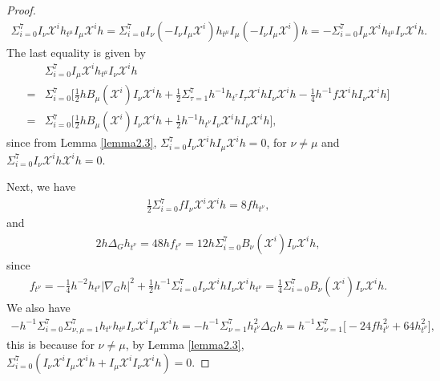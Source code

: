 \documentclass[10pt,a4paper]{amsart}
\numberwithin{equation}{section}
\begin{document}
\begin{proof}
\begin{align*}
\Sigma_{i=0}^7I_\nu\mathscr{X}^i h_{t^\mu}I_\mu\mathscr{X}^i h=\Sigma_{i=0}^7 I_\nu(-I_\nu I_\mu\mathscr{X}^i) h_{t^\mu}I_\mu(-I_\nu I_\mu\mathscr{X}^i) h=-\Sigma_{i=0}^7I_\mu \mathscr{X}^i h_{t^\mu}I_\nu \mathscr{X}^i h.
\end{align*}
The last equality is given by
\begin{align*}
    &\Sigma_{i=0}^7I_\mu\mathscr{X}^i h_{t^\mu}I_\nu\mathscr{X}^ih\\=&\Sigma_{i=0}^7\bigg[\frac{1}{2}hB_\mu(\mathscr{X}^i)I_\nu\mathscr{X}^i h+\frac{1}{2}\Sigma_{\tau=1}^7h^{-1}h_{t^\tau}I_\tau \mathscr{X}^i hI_\nu\mathscr{X}^i h-\frac{1}{4}h^{-1}f\mathscr{X}^i h I_\nu\mathscr{X}^i h\bigg]\\=&\Sigma_{i=0}^7\bigg[\frac{1}{2}hB_\mu(\mathscr{X}^i)I_\nu\mathscr{X}^i h+\frac{1}{2}h^{-1}h_{t^\nu}I_\nu \mathscr{X}^i hI_\nu\mathscr{X}^i h\bigg],\end{align*}
since from Lemma \ref{lemma2.3}, $\Sigma_{i=0}^7I_\nu \mathscr{X}^i h I_\mu \mathscr{X}^i h=0$, for $\nu\neq \mu$ and $\Sigma_{i=0}^7I_\nu\mathscr{X}^i h\mathscr{X}^i h=0.$


Next, we have
\begin{align*}
    \frac{1}{2}\Sigma_{i=0}^7fI_\nu\mathscr{X}^i\mathscr{X}^i h=8fh_{t^\nu},
\end{align*}
and
\begin{align*}
    2h\Delta_G h_{t^\nu}=48 h f_{t^\nu}=12h\Sigma_{i=0}^7B_\nu(\mathscr{X}^i)I_\nu\mathscr{X}^i h,\end{align*}
    since
\begin{align}\label{ft}
    f_{t^\nu}=-\frac{1}{4}h^{-2}h_{t^\nu}|\nabla_G h|^2+\frac{1}{2}h^{-1}\Sigma_{i=0}^7  I_\nu\mathscr{X}^i h I_\nu\mathscr{X}^i h_{t^\nu}=\frac{1}{4}\Sigma_{i=0}^7B_\nu(\mathscr{X}^i)I_\nu\mathscr{X}^i h.
    \end{align}
We also have
\begin{align*}
    -h^{-1}\Sigma_{i=0}^7\Sigma_{\nu,\mu=1}^7h_{t^\nu}h_{t^\mu}I_\nu \mathscr{X}^i I_\mu\mathscr{X}^i h=-h^{-1}\Sigma_{\nu=1}^7h^2_{t^\nu}\Delta_G h=h^{-1}\Sigma_{\nu=1}^7\bigg[-24fh_{t^\nu}^2+64h_{t^\nu}^2\bigg],
    \end{align*}
this is because for $\nu\neq \mu$, by Lemma \ref{lemma2.3}, $\Sigma_{i=0}^7(I_\nu \mathscr{X}^iI_\mu \mathscr{X}^i h+I_\mu\mathscr{X}^iI_\nu\mathscr{X}^ih)=0.$


\end{proof}
\end{document}
